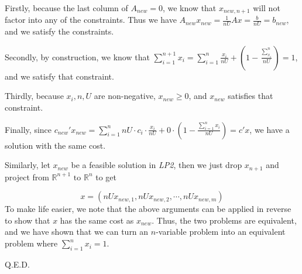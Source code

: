 Firstly, because the last column of $A_{new}=0$, we know that $x_{new, n+1}$ will not factor into any of the constraints. Thus we have $A_{new}x_{new}=\frac{1}{nU}Ax=\frac{b}{nU}=b_{new}$, and we satisfy the constraints.

Secondly, by construction, we know that $\sum_{i=1}^{n+1}x_i=\sum_{i=1}^{n}\frac{x_i}{nU}+(1 - \frac{\sum_{x_i}^{n}}{nU})=1$, and we satisfy that constraint.

Thirdly, because $x_i, n, U$ are non-negative, $x_{new}\geq 0$, and $x_{new}$ satisfies that constraint.

Finally, since $c_{new}'x_{new}=\sum_{i=1}^n nU\cdot c_i\cdot \frac{x_i}{nU} + 0\cdot (1 - \frac{\sum_{i=1}^{n}x_i}{nU})=c'x$, we have a solution with the same cost.


Similarly, let $x_{new}$ be a feasible solution in \textit{LP2}, then we just drop $x_{n+1}$ and project from $\mathbb{R}^{n+1} \text{ to } \mathbb{R}^n$ to get

\[ x = (nUx_{new,1}, nUx_{new, 2}, \cdots, nUx_{new, m})\]
To make life easier, we note that the above arguments can be applied in reverse to show that $x$ has the same cost as $x_{new}$. Thus, the two problems are equivalent, and we have shown that we can turn an $n$-variable problem into an equivalent problem where $\sum_{i=1}^{n}x_i=1$.

Q.E.D.